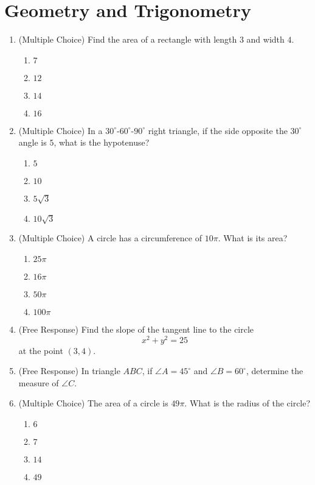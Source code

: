 \documentclass[12pt]{article}
\begin{document}
\section{Geometry and Trigonometry}
\begin{enumerate}[label=\textbf{Question \arabic*:}]
  \item (Multiple Choice) Find the area of a rectangle with length \(3\) and width \(4\).
    \begin{enumerate}[label=(\Alph*)]
      \item \(7\)
      \item \(12\)
      \item \(14\)
      \item \(16\)
    \end{enumerate}
    
  \item (Multiple Choice) In a \(30^\circ\text{-}60^\circ\text{-}90^\circ\) right triangle, if the side opposite the \(30^\circ\) angle is \(5\), what is the hypotenuse?
    \begin{enumerate}[label=(\Alph*)]
      \item \(5\)
      \item \(10\)
      \item \(5\sqrt{3}\)
      \item \(10\sqrt{3}\)
    \end{enumerate}
    
  \item (Multiple Choice) A circle has a circumference of \(10\pi\). What is its area?
    \begin{enumerate}[label=(\Alph*)]
      \item \(25\pi\)
      \item \(16\pi\)
      \item \(50\pi\)
      \item \(100\pi\)
    \end{enumerate}
    
  \item (Free Response) Find the slope of the tangent line to the circle
    \[
    x^2 + y^2 = 25
    \]
    at the point \((3,4)\).
    
  \item (Free Response) In triangle \(ABC\), if \(\angle A = 45^\circ\) and \(\angle B = 60^\circ\), determine the measure of \(\angle C\).
  
  \item (Multiple Choice) The area of a circle is \(49\pi\). What is the radius of the circle?
    \begin{enumerate}[label=(\Alph*)]
      \item \(6\)
      \item \(7\)
      \item \(14\)
      \item \(49\)
    \end{enumerate}
    

\end{enumerate}
\end{document}
